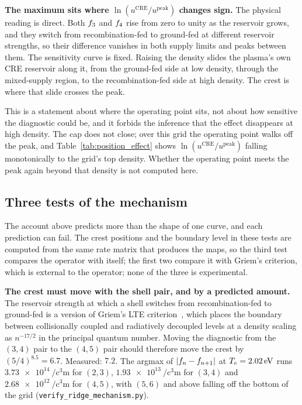 \textbf{The maximum sits where $\ln(u^{\mathrm{CRE}}/u^{\mathrm{peak}})$ changes
sign.} The physical reading is direct. Both $f_{3}$ and $f_{4}$ rise
from zero to unity as the reservoir grows, and they switch from
recombination-fed to ground-fed at different reservoir strengths, so their
difference vanishes in both supply limits and peaks between them. The
sensitivity curve is fixed. Raising the density slides the plasma's own CRE
reservoir along it, from the ground-fed side at low density, through the
mixed-supply region, to the recombination-fed side at high density. The crest
is where that slide crosses the peak.

This is a statement about where the operating point sits, not about how
sensitive the diagnostic could be, and it forbids the inference that the effect
disappears at high density. The cap does not close; over this grid the
operating point walks off the peak, and Table~\ref{tab:position_effect} shows
$\ln(u^{\mathrm{CRE}}/u^{\mathrm{peak}})$ falling monotonically to the grid's
top density. Whether the operating point meets the peak again beyond that
density is not computed here.

\subsection{Three tests of the mechanism}
\label{sec:griem_tests}

The account above predicts more than the shape of one curve, and each
prediction can fail. The crest positions and the boundary level in these tests
are computed from the same rate matrix that produces the maps, so the third
test compares the operator with itself; the first two compare it with Griem's
criterion, which is external to the operator; none of the three is
experimental.

\textbf{The crest must move with the shell pair, and by a predicted amount.}
The reservoir strength at which a shell switches from recombination-fed to
ground-fed is a version of Griem's LTE
criterion~\cite{Griem1963,Griem1997}, which places the boundary between
collisionally coupled and radiatively decoupled levels at a density scaling as
$n^{-17/2}$ in the principal quantum number. Moving the diagnostic from the
$(3,4)$ pair to the $(4,5)$ pair should therefore move the crest by
$(5/4)^{8.5} = 6.7$. Measured: $7.2$. The argmax of $|f_{n}-f_{n+1}|$
at $T_e = \SI{2.02}{\electronvolt}$ runs $\SI{3.73e14}{\per\cubic\centi\metre}$
for $(2,3)$, $\SI{1.93e13}{\per\cubic\centi\metre}$ for $(3,4)$ and
$\SI{2.68e12}{\per\cubic\centi\metre}$ for $(4,5)$, with $(5,6)$ and above
falling off the bottom of the grid (\texttt{verify\_ridge\_mechanism.py}).

